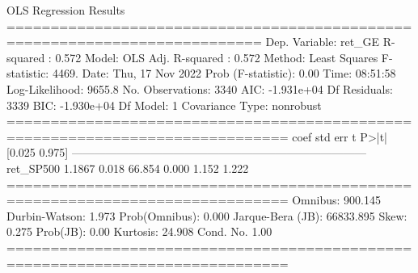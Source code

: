 \begin{ioutput}
OLS Regression Results                                
===========================================================================
Dep. Variable:                 ret_GE   R-squared :                   0.572
Model:                            OLS   Adj. R-squared :              0.572
Method:                 Least Squares   F-statistic:                  4469.
Date:                Thu, 17 Nov 2022   Prob (F-statistic):            0.00
Time:                        08:51:58   Log-Likelihood:              9655.8
No. Observations:                3340   AIC:                     -1.931e+04
Df Residuals:                    3339   BIC:                     -1.930e+04
Df Model:                           1                                                  
Covariance Type:            nonrobust                                                  
==============================================================================
coef    std err          t      P>|t|      [0.025      0.975]
------------------------------------------------------------------------------
ret_SP500      1.1867      0.018     66.854      0.000       1.152       1.222
==============================================================================
Omnibus:                      900.145   Durbin-Watson:                   1.973
Prob(Omnibus):                  0.000   Jarque-Bera (JB):            66833.895
Skew:                           0.275   Prob(JB):                         0.00
Kurtosis:                      24.908   Cond. No.                         1.00
==============================================================================
\end{ioutput}


